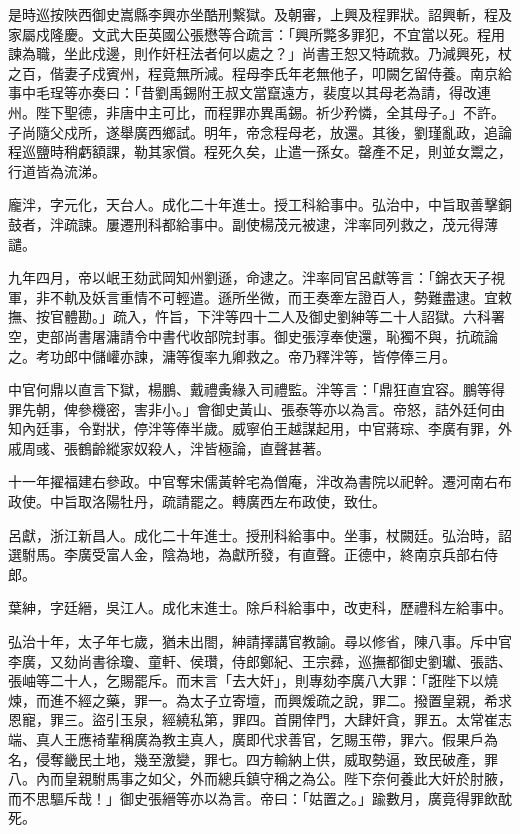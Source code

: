 \begin{pinyinscope}
是時巡按陜西御史嵩縣李興亦坐酷刑繫獄。及朝審，上興及程罪狀。詔興斬，程及家屬戍隆慶。文武大臣英國公張懋等合疏言：「興所斃多罪犯，不宜當以死。程用諫為職，坐此戍邊，則作奸枉法者何以處之？」尚書王恕又特疏救。乃減興死，杖之百，偕妻子戍賓州，程竟無所減。程母李氏年老無他子，叩闕乞留侍養。南京給事中毛珵等亦奏曰：「昔劉禹錫附王叔文當竄遠方，裴度以其母老為請，得改連州。陛下聖德，非唐中主可比，而程罪亦異禹錫。祈少矜憐，全其母子。」不許。子尚隨父戍所，遂舉廣西鄉試。明年，帝念程母老，放還。其後，劉瑾亂政，追論程巡鹽時稍虧額課，勒其家償。程死久矣，止遣一孫女。罄產不足，則並女鬻之，行道皆為流涕。

龐泮，字元化，天台人。成化二十年進士。授工科給事中。弘治中，中旨取善擊銅鼓者，泮疏諫。屢遷刑科都給事中。副使楊茂元被逮，泮率同列救之，茂元得薄譴。

九年四月，帝以岷王劾武岡知州劉遜，命逮之。泮率同官呂獻等言：「錦衣天子視軍，非不軌及妖言重情不可輕遣。遜所坐微，而王奏牽左證百人，勢難盡逮。宜敕撫、按官體勘。」疏入，忤旨，下泮等四十二人及御史劉紳等二十人詔獄。六科署空，吏部尚書屠滽請令中書代收部院封事。御史張淳奉使還，恥獨不與，抗疏論之。考功郎中儲巏亦諫，滽等復率九卿救之。帝乃釋泮等，皆停俸三月。

中官何鼎以直言下獄，楊鵬、戴禮夤緣入司禮監。泮等言：「鼎狂直宜容。鵬等得罪先朝，俾參機密，害非小。」會御史黃山、張泰等亦以為言。帝怒，詰外廷何由知內廷事，令對狀，停泮等俸半歲。威寧伯王越謀起用，中官蔣琮、李廣有罪，外戚周彧、張鶴齡縱家奴殺人，泮皆極論，直聲甚著。

十一年擢福建右參政。中官奪宋儒黃幹宅為僧庵，泮改為書院以祀幹。遷河南右布政使。中旨取洛陽牡丹，疏請罷之。轉廣西左布政使，致仕。

呂獻，浙江新昌人。成化二十年進士。授刑科給事中。坐事，杖闕廷。弘治時，詔選駙馬。李廣受富人金，陰為地，為獻所發，有直聲。正德中，終南京兵部右侍郎。

葉紳，字廷縉，吳江人。成化末進士。除戶科給事中，改吏科，歷禮科左給事中。

弘治十年，太子年七歲，猶未出閤，紳請擇講官教諭。尋以修省，陳八事。斥中官李廣，又劾尚書徐瓊、童軒、侯瓚，侍郎鄭紀、王宗彞，巡撫都御史劉瓛、張誥、張岫等二十人，乞賜罷斥。而末言「去大奸」，則專劾李廣八大罪：「誑陛下以燒煉，而進不經之藥，罪一。為太子立寄壇，而興煖疏之說，罪二。撥置皇親，希求恩寵，罪三。盜引玉泉，經繞私第，罪四。首開倖門，大肆奸貪，罪五。太常崔志端、真人王應裿輩稱廣為教主真人，廣即代求善官，乞賜玉帶，罪六。假果戶為名，侵奪畿民土地，幾至激變，罪七。四方輸納上供，威取勢逼，致民破產，罪八。內而皇親駙馬事之如父，外而總兵鎮守稱之為公。陛下奈何養此大奸於肘腋，而不思驅斥哉！」御史張縉等亦以為言。帝曰：「姑置之。」踰數月，廣竟得罪飲酖死。


\end{pinyinscope}
